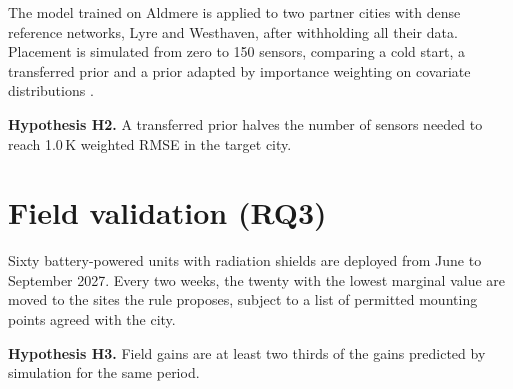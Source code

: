 The model trained on Aldmere is applied to two partner cities with
dense reference networks, Lyre and Westhaven, after withholding all
their data. Placement is simulated from zero to 150 sensors, comparing
a cold start, a transferred prior and a prior adapted by importance
weighting on covariate distributions \parencite{sugiyama2007covariate}.

\textbf{Hypothesis H2.} A transferred prior halves the number of
sensors needed to reach 1.0\,K weighted RMSE in the target city.

\section{Field validation (RQ3)}

Sixty battery-powered units with radiation shields are deployed from
June to September 2027. Every two weeks, the twenty with the lowest
marginal value are moved to the sites the rule proposes, subject to a
list of permitted mounting points agreed with the city.

\textbf{Hypothesis H3.} Field gains are at least two thirds of the gains
predicted by simulation for the same period.
